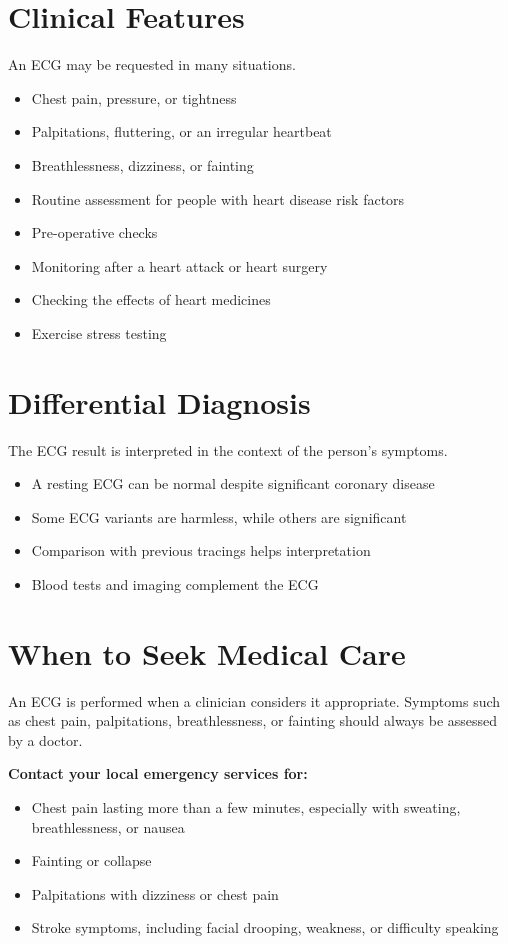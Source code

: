 \section*{Clinical Features}
An ECG may be requested in many situations.
\begin{itemize}
    \item Chest pain, pressure, or tightness
    \item Palpitations, fluttering, or an irregular heartbeat
    \item Breathlessness, dizziness, or fainting
    \item Routine assessment for people with heart disease risk factors
    \item Pre-operative checks
    \item Monitoring after a heart attack or heart surgery
    \item Checking the effects of heart medicines
    \item Exercise stress testing
\end{itemize}

\section*{Differential Diagnosis}
The ECG result is interpreted in the context of the person's symptoms.
\begin{itemize}
    \item A resting ECG can be normal despite significant coronary disease
    \item Some ECG variants are harmless, while others are significant
    \item Comparison with previous tracings helps interpretation
    \item Blood tests and imaging complement the ECG
\end{itemize}

\section*{When to Seek Medical Care}
An ECG is performed when a clinician considers it appropriate. Symptoms such as chest pain, palpitations, breathlessness, or fainting should always be assessed by a doctor.

\textbf{Contact your local emergency services for:}
\begin{itemize}
    \item Chest pain lasting more than a few minutes, especially with sweating, breathlessness, or nausea
    \item Fainting or collapse
    \item Palpitations with dizziness or chest pain
    \item Stroke symptoms, including facial drooping, weakness, or difficulty speaking
\end{itemize}


